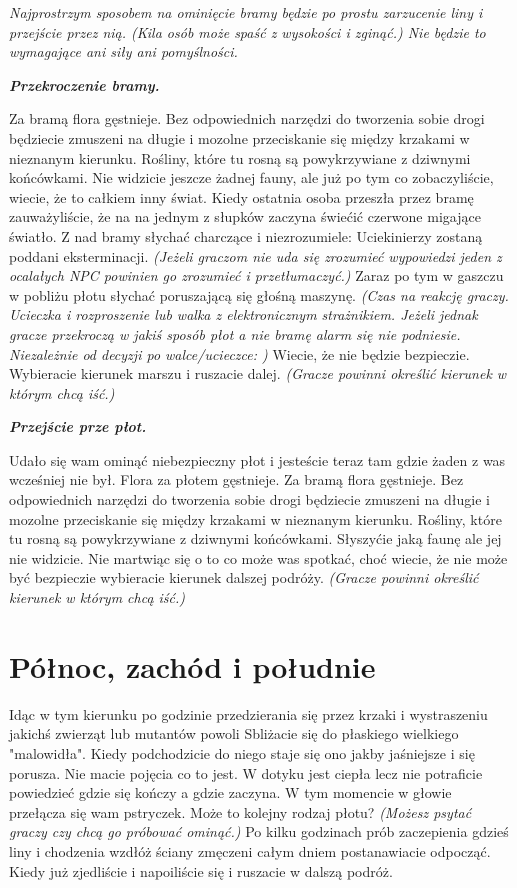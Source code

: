 \documentclass{article}
\begin{document}
    \bigskip
    \slshape
    Najprostrzym sposobem na ominięcie bramy będzie po prostu zarzucenie liny i przejście przez nią. (Kila osób może spaść z wysokości i zginąć.) Nie będzie to wymagające ani siły ani pomyślności.

    \bigskip
    \normalfont
    \emph{\textbf{Przekroczenie bramy.}}

    Za bramą flora gęstnieje. Bez odpowiednich narzędzi do tworzenia sobie drogi będziecie zmuszeni na długie i mozolne przeciskanie się między krzakami w nieznanym kierunku. Rośliny, które tu rosną są powykrzywiane z dziwnymi końcówkami. Nie widzicie jeszcze żadnej fauny, ale już po tym co zobaczyliście, wiecie, że to całkiem inny świat. Kiedy ostatnia osoba przeszła przez bramę zauważyliście, że na na jednym z słupków zaczyna świećić czerwone migające światło. Z nad bramy słychać charczące i niezrozumiele: Uciekinierzy zostaną poddani eksterminacji. \emph{(Jeżeli graczom nie uda się zrozumieć wypowiedzi jeden z ocalałych NPC powinien go zrozumieć i przetłumaczyć.)} Zaraz po tym w gaszczu w pobliżu płotu słychać poruszającą się głośną maszynę. \emph{(Czas na reakcję graczy. Ucieczka i rozproszenie lub walka z elektronicznym strażnikiem. Jeżeli jednak gracze przekroczą w jakiś sposób płot a nie bramę alarm się nie podniesie. Niezależnie od decyzji po walce/ucieczce: )} Wiecie, że nie będzie bezpieczie. Wybieracie kierunek marszu i ruszacie dalej. \emph{(Gracze powinni określić kierunek w którym chcą iść.)}

    \bigskip
    \normalfont
    \emph{\textbf{Przejście prze płot.}}

    Udało się wam ominąć niebezpieczny płot i jesteście teraz tam gdzie żaden z was wcześniej nie był. Flora za płotem gęstnieje. Za bramą flora gęstnieje. Bez odpowiednich narzędzi do tworzenia sobie drogi będziecie zmuszeni na długie i mozolne przeciskanie się między krzakami w nieznanym kierunku. Rośliny, które tu rosną są powykrzywiane z dziwnymi końcówkami. Słyszyćie jaką faunę ale jej nie widzicie. Nie martwiąc się o to co może was spotkać, choć wiecie, że nie może być bezpieczie wybieracie kierunek dalszej podróży. \emph{(Gracze powinni określić kierunek w którym chcą iść.)}

    \section{Północ, zachód i południe}

    Idąc w tym kierunku po godzinie przedzierania się przez krzaki i wystraszeniu jakichś zwierząt lub mutantów powoli Sbliżacie się do płaskiego wielkiego "malowidła". Kiedy podchodzicie do niego staje się ono jakby jaśniejsze i się porusza. Nie macie pojęcia co to jest. W dotyku jest ciepła lecz nie potraficie powiedzieć gdzie się kończy a gdzie zaczyna. W tym momencie w głowie przełącza się wam pstryczek. Może to kolejny rodzaj płotu? \emph{(Możesz psytać graczy czy chcą go próbować ominąć.)} Po kilku godzinach prób zaczepienia gdzieś liny i chodzenia wzdłóż ściany zmęczeni całym dniem postanawiacie odpocząć. Kiedy już zjedliście i napoiliście się i ruszacie w dalszą podróż.
\end{document}
